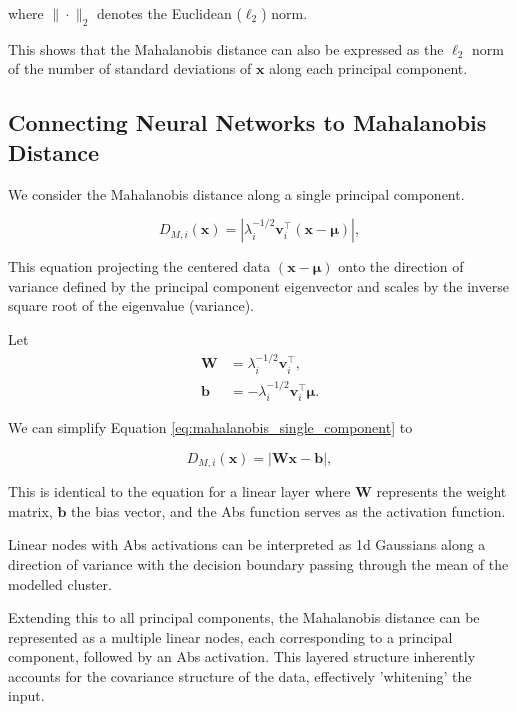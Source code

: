 where $\| \cdot \|_2$ denotes the Euclidean ($\ell_2$) norm. 

This shows that the Mahalanobis distance can also be expressed as the $\ell_2$ norm of the number of standard deviations of \(\mathbf{x}\) along each principal component.

\subsection{Connecting Neural Networks to Mahalanobis Distance}

We consider the Mahalanobis distance along a single principal component.

\begin{equation}
    \label{eq:mahalanobis_single_component}
    D_{M,i}(\mathbf{x}) = \left| \lambda_i^{-1/2} \mathbf{v}_i^\top (\mathbf{x} - \boldsymbol{\mu}) \right|,
\end{equation}

This equation projecting the centered data $(\mathbf{x} - \boldsymbol{\mu})$ onto the direction of variance defined by the principal component eigenvector and scales by the inverse square root of the eigenvalue (variance).

Let 
\begin{align}
    \mathbf{W} &= \lambda_i^{-1/2} \mathbf{v}_i^\top, \\
    \mathbf{b} &= - \lambda_i^{-1/2} \mathbf{v}_i^\top \boldsymbol{\mu}.
\end{align}

We can simplify Equation \eqref{eq:mahalanobis_single_component} to

\begin{equation}
    \label{eq:mahalanobis_linear}
    D_{M,i}(\mathbf{x}) = \left| \mathbf{W} \mathbf{x} - \mathbf{b} \right|,
\end{equation}

This is identical to the equation for a linear layer where $\boldsymbol{W}$ represents the weight matrix, $\boldsymbol{b}$ the bias vector, and the Abs function serves as the activation function.

Linear nodes with Abs activations can be interpreted as 1d Gaussians along a direction of variance with the decision boundary passing through the mean of the modelled cluster.

Extending this to all principal components, the Mahalanobis distance can be represented as a multiple linear nodes, each corresponding to a principal component, followed by an Abs activation. This layered structure inherently accounts for the covariance structure of the data, effectively 'whitening' the input.

